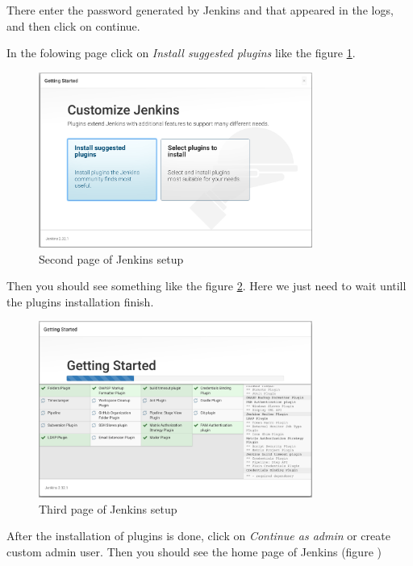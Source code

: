 There enter the password generated by Jenkins and that appeared in the logs, and then click on continue.

In the folowing page click on \textit{Install suggested plugins} like the figure \ref{fig:jenkins-02}.

\begin{figure}[H]
	\centering
    \includegraphics[width=0.8\textwidth]{grafiken/jenkins-02}
    \caption{Second page of Jenkins setup}
    \label{fig:jenkins-02}
\end{figure}

Then you should see something like the figure \ref{fig:jenkins-03}. Here we just need to wait untill the plugins installation finish.

\begin{figure}[H]
	\centering
    \includegraphics[width=0.8\textwidth]{grafiken/jenkins-03}
    \caption{Third page of Jenkins setup}
    \label{fig:jenkins-03}
\end{figure}

After the installation of plugins is done, click on \textit{Continue as admin} or create custom admin user. Then you should see the home page of Jenkins (figure )

